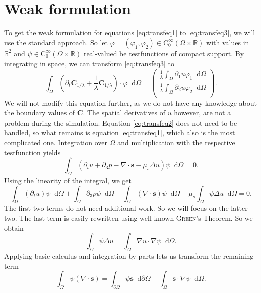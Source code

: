 \documentclass[12pt,a4paper,twoside, open=right]{scrreprt}
\theoremstyle{definition}
\theoremstyle{plain}
\newcommand{\rr}{\mathbb{R}}
\newcommand{\bfs}{\bm{s}}
\newcommand{\bfC}{\bm{C}}
\newcommand{\D}{\mathop{}\!\mathrm{d}}
\begin{document}
\section{Weak formulation}
To get the weak formulation for equations \eqref{eq:transfeq1} to \eqref{eq:transfeq3}, we will use the standard approach. So let $\varphi = (\varphi_1,\varphi_2)\in \mathrm{C}^\infty_0(\Omega\times\rr)$ with values in $\rr^2$ and $\psi\in \mathrm{C}^\infty_0(\Omega\times\rr)$ real-valued be testfunctions of compact support. By integrating in space, we can transform \eqref{eq:transfeq3} to 
\begin{equation}
    \int_\Omega(\partial_t\bfC_{1/\lambda}+\frac{1}{\lambda}\bfC_{1/\lambda})\cdot\varphi\D\Omega = 
    \begin{pmatrix}
    \frac{1}{\lambda}\int_\Omega\partial_1 u\varphi_1\D\Omega\\\frac{1}{\lambda}\int_\Omega\partial_2 u\varphi_2\D\Omega\\
    \end{pmatrix}.
\end{equation}
We will not modify this equation further, as we do not have any knowledge about the boundary values of $\bfC$. The spatial derivatives of $u$ however, are not a problem during the simulation. Equation \eqref{eq:transfeq2} does not need to be handled, so what remains is equation \eqref{eq:transfeq1}, which also is the most complicated one. Integration over $\Omega$ and multiplication with the respective testfunction yields
\begin{equation}
    \int_\Omega(\partial_t u + \partial_3 p -\nabla\cdot \bfs -\mu_s\Delta u)\psi\D\Omega = 0.
\end{equation}
Using the linearity of the integral, we get
\begin{equation}
    \int_\Omega(\partial_t u)\psi\D\Omega +\int_\Omega\partial_3 p\psi\D\Omega -\int_\Omega(\nabla\cdot \bfs)\psi\D\Omega -\mu_s\int_\Omega\psi\Delta u\D\Omega=0.
\end{equation}
The first two terms do not need additional work. So we will focus on the latter two. The last term is easily rewritten using well-known \textsc{Green}'s Theorem. So we obtain
\begin{equation}
    \int_\Omega \psi\Delta u = \int_\Omega\nabla u\cdot \nabla\psi\D\Omega.
\end{equation}
Applying basic calculus and integration by parts lets us transform the remaining term
\begin{equation}
    \int_\Omega \psi(\nabla\cdot\bfs) =\int_{\partial\Omega}\psi\bfs\D\partial\Omega -\int_\Omega\bfs\cdot\nabla\psi\D\Omega.
\end{equation}
\end{document}
